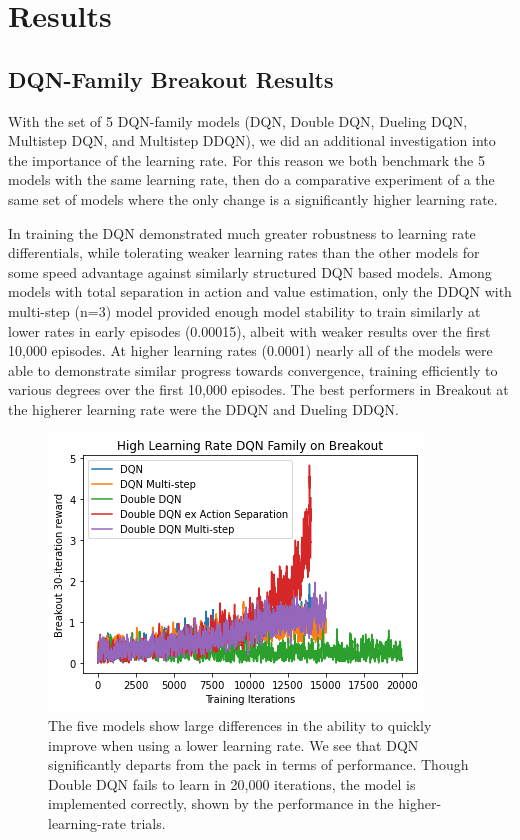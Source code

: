\documentclass[conference]{IEEEtran}
\begin{document}
\section{Results} \label{results}

\subsection{DQN-Family Breakout Results}
With the set of 5 DQN-family models (DQN, Double DQN, Dueling DQN, Multistep DQN, and Multistep DDQN), we did an additional investigation into the importance of the learning rate. For this reason we both benchmark the 5 models with the same learning rate, then do a comparative experiment of a the same set of models where the only change is a significantly higher learning rate.

In training the DQN demonstrated much greater robustness to learning rate differentials, while tolerating weaker learning rates than the other models for some speed advantage against similarly structured DQN based models.  Among models with total separation in action and value estimation, only the DDQN with multi-step (n=3) model provided enough model stability to train similarly at lower rates in early episodes (0.00015), albeit with weaker results over the first 10,000 episodes.  At higher learning rates (0.0001) nearly all of the models were able to demonstrate similar progress towards convergence, training efficiently to various degrees over the first 10,000 episodes.  The best performers in Breakout at the higherer learning rate were the DDQN and Dueling DDQN.

\begin{figure}
\centerline{\includegraphics[scale=0.6]{DQNs_breakout_high_train.png}}
\caption{The five models show large differences in the ability to quickly improve when using a lower learning rate. We see that DQN significantly departs from the pack in terms of performance. Though Double DQN fails to learn in 20,000 iterations, the model is implemented correctly, shown by the performance in the higher-learning-rate trials.}
\end{figure}
\end{document}
